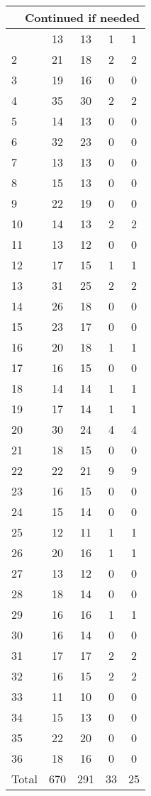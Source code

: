 \begin{center}
\begin{longtable}{l|c|c|c|c}
\hline \multicolumn{5}{|r|}{{Continued if needed}} \\ \hline
\endfoot 
1 & 13 & 13 & 1 & 1\\ \hline
2 & 21 & 18 & 2 & 2\\ \hline
3 & 19 & 16 & 0 & 0\\ \hline
4 & 35 & 30 & 2 & 2\\ \hline
5 & 14 & 13 & 0 & 0\\ \hline
6 & 32 & 23 & 0 & 0\\ \hline
7 & 13 & 13 & 0 & 0\\ \hline
8 & 15 & 13 & 0 & 0\\ \hline
9 & 22 & 19 & 0 & 0\\ \hline
10 & 14 & 13 & 2 & 2\\ \hline
11 & 13 & 12 & 0 & 0\\ \hline
12 & 17 & 15 & 1 & 1\\ \hline
13 & 31 & 25 & 2 & 2\\ \hline
14 & 26 & 18 & 0 & 0\\ \hline
15 & 23 & 17 & 0 & 0\\ \hline
16 & 20 & 18 & 1 & 1\\ \hline
17 & 16 & 15 & 0 & 0\\ \hline
18 & 14 & 14 & 1 & 1\\ \hline
19 & 17 & 14 & 1 & 1\\ \hline
20 & 30 & 24 & 4 & 4\\ \hline
21 & 18 & 15 & 0 & 0\\ \hline
22 & 22 & 21 & 9 & 9\\ \hline
23 & 16 & 15 & 0 & 0\\ \hline
24 & 15 & 14 & 0 & 0\\ \hline
25 & 12 & 11 & 1 & 1\\ \hline
26 & 20 & 16 & 1 & 1\\ \hline
27 & 13 & 12 & 0 & 0\\ \hline
28 & 18 & 14 & 0 & 0\\ \hline
29 & 16 & 16 & 1 & 1\\ \hline
30 & 16 & 14 & 0 & 0\\ \hline
31 & 17 & 17 & 2 & 2\\ \hline
32 & 16 & 15 & 2 & 2\\ \hline
33 & 11 & 10 & 0 & 0\\ \hline
34 & 15 & 13 & 0 & 0\\ \hline
35 & 22 & 20 & 0 & 0\\ \hline
36 & 18 & 16 & 0 & 0\\ \hline
Total & 670 & 291 & 33 & 25
\end{longtable}
\end{center}



